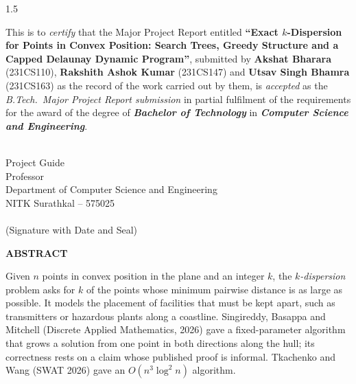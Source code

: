 \documentclass[12pt,oneside,openany]{report}
\theoremstyle{definition}
\theoremstyle{remark}
\newcommand{\ReportTitle}{Exact $k$-Dispersion for Points in Convex Position: Search Trees, Greedy Structure and a Capped Delaunay Dynamic Program}
\newcommand{\StudentA}{Akshat Bharara}
\newcommand{\StudentB}{Rakshith Ashok Kumar}
\newcommand{\StudentC}{Utsav Singh Bhamra}
\newcommand{\RegA}{231CS110}
\newcommand{\RegB}{231CS147}
\newcommand{\RegC}{231CS163}
\newcommand{\Guide}{Prof.\ Manjanna B}
\newcommand{\GuideDesignation}{Professor}
\newcommand{\Department}{Computer Science and Engineering}
\begin{document}
\begin{spacing}{1.5}
\begin{titlepage}
\vspace*{0.4in}
\indent This is to \textit{certify} that the Major Project Report entitled
{\bf\textquotedblleft\ReportTitle\textquotedblright}, submitted by
{\bf \StudentA} (\RegA), {\bf \StudentB} (\RegB) and {\bf \StudentC} (\RegC)
as the record of the work carried out by them, is \textit{accepted} as the
\textit{B.Tech.\ Major Project Report submission} in partial fulfilment of the
requirements for the award of the degree of {\bf\textit{Bachelor of
Technology}} in {\bf\textit{\Department}}.

\vspace*{0.9in}
\begin{singlespacing}
\hspace*{2.5in}
\parbox{3in}
{\noindent {\bf \Guide} \\
\noindent Project Guide \\
\noindent \GuideDesignation\\
\noindent Department of \Department\\
\noindent NITK Surathkal -- 575025
\vspace*{1.1in}\\
 \\
\noindent (Signature with Date and Seal)}
\end{singlespacing}
\end{titlepage}


\newpage
\begin{titlepage}
\pagestyle{empty}
\begin{center}
\large \textbf{ABSTRACT}
\end{center}

\begin{singlespacing}
Given $n$ points in convex position in the plane and an integer $k$, the
\emph{$k$-dispersion} problem asks for $k$ of the points whose minimum pairwise
distance is as large as possible. It models the placement of facilities that
must be kept apart, such as transmitters or hazardous plants along a coastline.
Singireddy, Basappa and Mitchell (Discrete Applied Mathematics, 2026) gave a
fixed-parameter algorithm that grows a solution from one point in both
directions along the hull; its correctness rests on a claim whose published
proof is informal. Tkachenko and Wang (SWAT 2026) gave an $O(n^3\log^2n)$
algorithm.


\end{singlespacing}
\end{titlepage}
\end{spacing}
\end{document}
